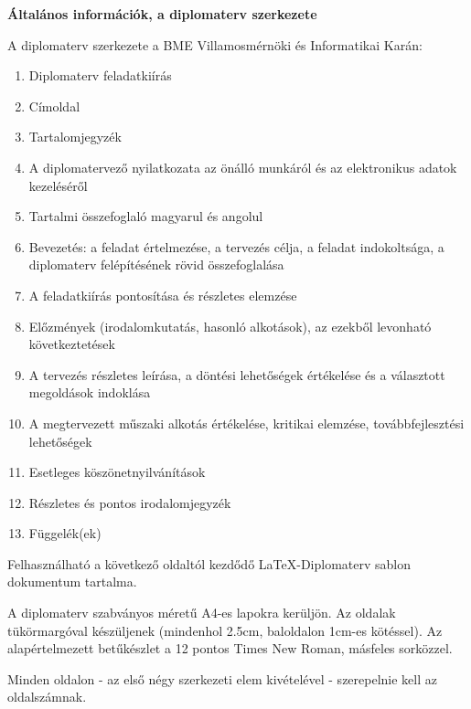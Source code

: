 
\footnotesize
\begin{center}
\large
\textbf{\Large Általános információk, a diplomaterv szerkezete}\\
\end{center}

A diplomaterv szerkezete a BME Villamosmérnöki és Informatikai Karán:
\begin{enumerate}
\item	Diplomaterv feladatkiírás
\item	Címoldal
\item	Tartalomjegyzék
\item	A diplomatervező nyilatkozata az önálló munkáról és az elektronikus adatok kezeléséről
\item	Tartalmi összefoglaló magyarul és angolul
\item	Bevezetés: a feladat értelmezése, a tervezés célja, a feladat indokoltsága, a diplomaterv felépítésének rövid összefoglalása
\item	A feladatkiírás pontosítása és részletes elemzése
\item	Előzmények (irodalomkutatás, hasonló alkotások), az ezekből levonható következtetések
\item	A tervezés részletes leírása, a döntési lehetőségek értékelése és a választott megoldások indoklása
\item	A megtervezett műszaki alkotás értékelése, kritikai elemzése, továbbfejlesztési lehetőségek
\item	Esetleges köszönetnyilvánítások
\item	Részletes és pontos irodalomjegyzék
\item	Függelék(ek)
\end{enumerate}

Felhasználható a következő oldaltól kezdődő \LaTeX-Diplomaterv sablon dokumentum tartalma. 

A diplomaterv szabványos méretű A4-es lapokra kerüljön. Az oldalak tükörmargóval készüljenek (mindenhol 2.5cm, baloldalon 1cm-es kötéssel). Az alapértelmezett betűkészlet a 12 pontos Times New Roman, másfeles sorközzel.

Minden oldalon - az első négy szerkezeti elem kivételével - szerepelnie kell az oldalszámnak.

